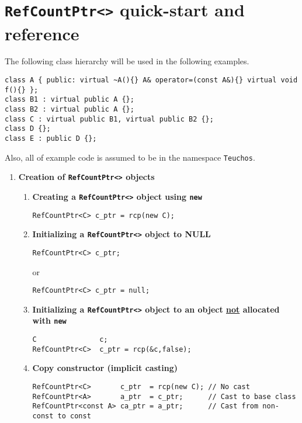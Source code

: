 %
\section{\texttt{RefCountPtr<>} quick-start and reference}
\label{rcp:apdx:quickstart}
%

The following class hierarchy will be used in the following
examples.
%
{\small\begin{verbatim}
class A { public: virtual ~A(){} A& operator=(const A&){} virtual void f(){} };
class B1 : virtual public A {};
class B2 : virtual public A {};
class C : virtual public B1, virtual public B2 {};
class D {};
class E : public D {};
\end{verbatim}}
%
Also, all of example code is assumed to be in the namespace
\texttt{Teuchos}.

\begin{enumerate}

\item {\bf Creation of \texttt{RefCountPtr<>} objects}

\begin{enumerate}

\item {\bf Creating a \texttt{RefCountPtr<>} object using \texttt{new}}
%
{\small\begin{verbatim}
RefCountPtr<C> c_ptr = rcp(new C);
\end{verbatim}}
%
\item {\bf Initializing a \texttt{RefCountPtr<>} object to NULL}
%
{\small\begin{verbatim}
RefCountPtr<C> c_ptr;
\end{verbatim}}
or
{\small\begin{verbatim}
RefCountPtr<C> c_ptr = null;
\end{verbatim}}
%
\item {\bf Initializing a \texttt{RefCountPtr<>} object to an object
       \underline{not} allocated with \texttt{new}}
%
{\small\begin{verbatim}
C               c;
RefCountPtr<C>  c_ptr = rcp(&c,false);
\end{verbatim}}
%
\item {\bf Copy constructor (implicit casting)}
%
{\small\begin{verbatim}
RefCountPtr<C>       c_ptr  = rcp(new C); // No cast
RefCountPtr<A>       a_ptr  = c_ptr;      // Cast to base class
RefCountPtr<const A> ca_ptr = a_ptr;      // Cast from non-const to const
\end{verbatim}}
%
\end{enumerate}


\end{enumerate}
